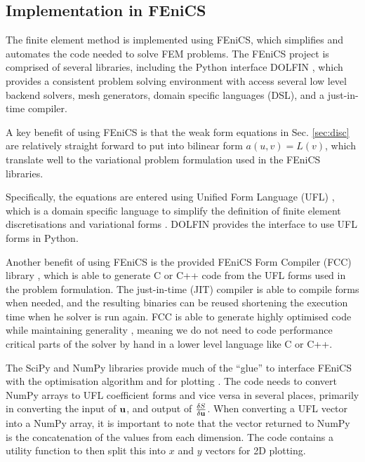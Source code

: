 \documentclass[a4paper, 12pt]{article}
\begin{document}
\subsection{Implementation in FEniCS}
The finite element method is implemented using FEniCS, which simplifies and
automates the code needed to solve FEM problems. The FEniCS project is
comprised of several libraries, including the Python interface DOLFIN
\cite{logg2010dolfin}, which provides a consistent problem solving environment
\cite{dolfin} with access several low level backend solvers, mesh generators,
 domain specific languages (DSL), and a just-in-time compiler. 

A key benefit of using FEniCS is that the weak form equations in
Sec. \ref{sec:disc} are relatively straight forward to put into bilinear form
$a(u,v) = L(v)$, which translate well to the variational problem formulation
used in the FEniCS libraries.

Specifically, the equations are entered using Unified Form Language (UFL) \cite{ufl}, which
is a domain specific language to simplify the definition of finite element
discretisations and variational forms \cite{alnaes2009unified}. DOLFIN provides
the interface to use UFL forms in Python.

Another benefit of using FEniCS is the provided FEniCS Form Compiler (FCC)
library \cite{fcc}, which is able to generate C or C++ code from the UFL forms
used in the problem formulation. The just-in-time (JIT) compiler is able to
compile forms when needed, and the resulting binaries can be reused shortening
the execution time when he solver is run again. FCC is able to generate highly
optimised code while maintaining generality \cite{logg2007automated}, meaning we
do not need to code performance critical parts of the solver by hand in a lower
level language like C or C++.

The SciPy and NumPy \cite{scipy} libraries provide much of the ``glue'' to
interface FEniCS with the optimisation algorithm and for plotting
\cite{hunter2007matplotlib}. The code needs to convert NumPy arrays to UFL
coefficient forms and vice versa in several places, primarily in converting the
input of $\mathbf{u}$, and output of $\frac{\delta S}{\delta \mathbf{u}}$. When converting a UFL
vector into a NumPy array, it is important to note that the vector returned to NumPy
is the concatenation of the values from each dimension. The code contains a
utility function to then split this into $x$ and $y$ vectors for 2D plotting.
\end{document}
